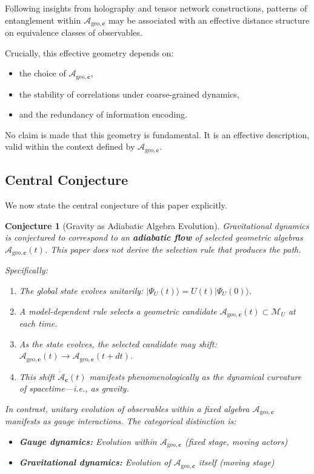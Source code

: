 \documentclass[12pt,a4paper]{article}
\newtheorem{conjecture}[theorem]{Conjecture}
\begin{document}
Following insights from holography and tensor network constructions, patterns of entanglement within $\mathcal{A}_{\mathrm{geo},\mathbf{c}}$ may be associated with an effective distance structure on equivalence classes of observables.

Crucially, this effective geometry depends on:
\begin{itemize}
    \item the choice of $\mathcal{A}_{\mathrm{geo},\mathbf{c}}$,
    \item the stability of correlations under coarse-grained dynamics,
    \item and the redundancy of information encoding.
\end{itemize}

No claim is made that this geometry is fundamental. It is an effective description, valid within the context defined by $\mathcal{A}_{\mathrm{geo},\mathbf{c}}$.

\subsection{Central Conjecture}

We now state the central conjecture of this paper explicitly.

\begin{conjecture}[Gravity as Adiabatic Algebra Evolution]
\label{conj:main}
Gravitational dynamics is conjectured to correspond to an \textbf{adiabatic flow} of selected geometric algebras $\mathcal{A}_{\mathrm{geo},\mathbf{c}}(t)$.  This paper does not derive the selection rule that produces the path.

Specifically:
\begin{enumerate}
    \item The global state evolves unitarily: $|\Psi_U(t)\rangle = U(t)|\Psi_U(0)\rangle$.
    \item A model-dependent rule selects a geometric candidate $\mathcal{A}_{\mathrm{geo},\mathbf{c}}(t)\subset\mathcal M_U$ at each time.
    \item As the state evolves, the selected candidate may shift: $\mathcal{A}_{\mathrm{geo},\mathbf{c}}(t) \to \mathcal{A}_{\mathrm{geo},\mathbf{c}}(t + dt)$.
    \item This shift $\dot{\mathcal{A}}_{\mathbf{c}}(t)$ manifests phenomenologically as the dynamical curvature of spacetime—i.e., as gravity.
\end{enumerate}

In contrast, unitary evolution of observables \emph{within} a fixed algebra $\mathcal{A}_{\mathrm{geo},\mathbf{c}}$ manifests as gauge interactions. The categorical distinction is:
\begin{itemize}
    \item \textbf{Gauge dynamics:} Evolution within $\mathcal{A}_{\mathrm{geo},\mathbf{c}}$ (fixed stage, moving actors)
    \item \textbf{Gravitational dynamics:} Evolution of $\mathcal{A}_{\mathrm{geo},\mathbf{c}}$ itself (moving stage)
\end{itemize}
\end{conjecture}
\end{document}
